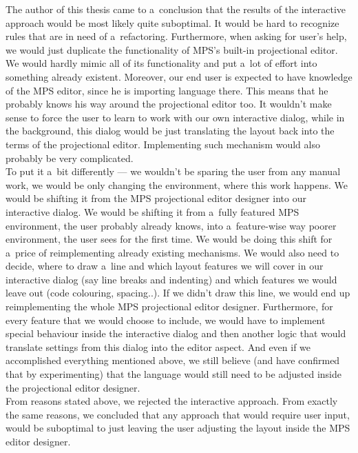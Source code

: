 The author of this thesis came to a~conclusion that the results of the interactive approach would be most likely quite suboptimal.
It would be hard to recognize rules that are in need of a~refactoring.
Furthermore, when asking for user's help, we would just duplicate the functionality of MPS's built-in projectional editor.
We would hardly mimic all of its functionality and put a~lot of effort into something already existent.
Moreover, our end user is expected to have knowledge of the MPS editor, since he is importing language there.
This means that he probably knows his way around the projectional editor too.
It wouldn't make sense to force the user to learn to work with our own interactive dialog, while in the background, this dialog would be just translating the layout back into the terms of the projectional editor.
Implementing such mechanism would also probably be very complicated.
\\

To put it a~bit differently --- we wouldn't be sparing the user from any manual work, we would be only changing the environment, where this work happens.
We would be shifting it from the MPS projectional editor designer into our interactive dialog.
We would be shifting it from a~fully featured MPS environment, the user probably already knows, into a~feature-wise way poorer environment, the user sees for the first time.
We would be doing this shift for a~price of reimplementing already existing mechanisms.
We would also need to decide, where to draw a~line and which layout features we will cover in our interactive dialog (say line breaks and indenting) and which features we would leave out (code colouring, spacing..).
If we didn't draw this line, we would end up reimplementing the whole MPS projectional editor designer.
Furthermore, for every feature that we would choose to include, we would have to implement special behaviour inside the interactive dialog and then another logic that would translate settings from this dialog into the editor aspect.
And even if we accomplished everything mentioned above, we still believe (and have confirmed that by experimenting) that the language would still need to be adjusted inside the projectional editor designer.
\\

From reasons stated above, we rejected the interactive approach.
From exactly the same reasons, we concluded that any approach that would require user input, would be suboptimal to just leaving the user adjusting the layout inside the MPS editor designer.

